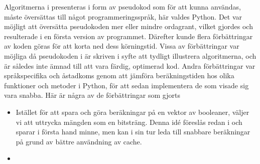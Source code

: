 
Algoritmerna i \cite{HaraldSieve} presenteras i form av pseudokod som för att kunna användas, måste översättas till något programmeringsspråk, här valdes Python.
Det var möjligt att översätta pseudokoden mer eller mindre ordagrant, vilket gjordes och resulterade i en första version av programmet.
Därefter kunde flera förbättringar av koden göras för att korta ned dess körningstid. 
Vissa av förbättringar var möjliga då pseudokoden i \cite{HaraldSieve} är skriven i syfte att tydligt illustrera algoritmerna,
och är således inte ämnad till att vara färdig, optimerad kod.
Andra förbättringar var språkspecifika och åstadkoms genom att jämföra beräkningstiden hos olika funktioner och metoder i Python, för att sedan implementera de som visade sig vara snabba. Här är några av de förbättringar som gjorts
\begin{itemize}
    \item Istället för att spara och göra beräkningar på en vektor av booleaner, väljer vi att uttrycka mängden som en bitsträng. 
    Denna idé föreslås redan i \cite{HaraldSieve} och sparar i första hand minne,
    men kan i sin tur leda till snabbare beräkningar på grund av bättre användning av cache.
    
    \item 
    
    
\end{itemize}



